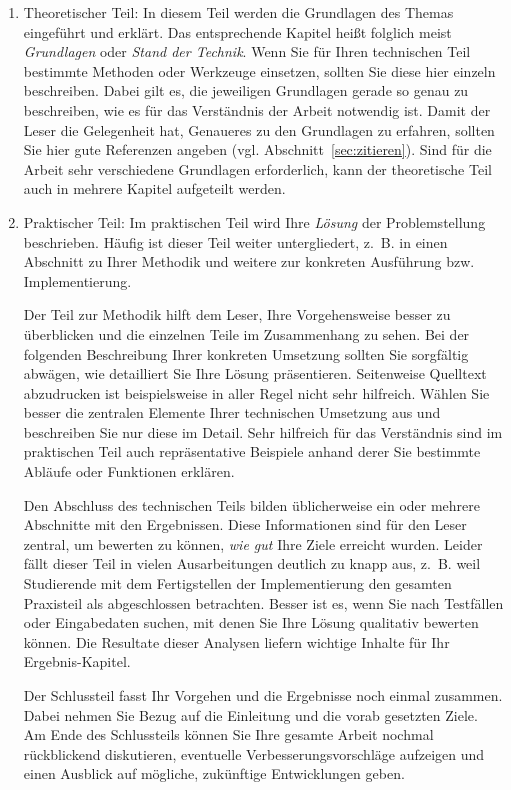 \begin{enumerate}
\item Theoretischer Teil: In diesem Teil werden die Grundlagen des Themas eingeführt und erklärt. Das entsprechende Kapitel heißt folglich meist \textit{Grundlagen} oder \textit{Stand der Technik}. 
Wenn Sie für Ihren technischen Teil bestimmte Methoden oder Werkzeuge einsetzen, sollten Sie diese hier einzeln beschreiben.
Dabei gilt es, die jeweiligen Grundlagen gerade so genau zu beschreiben, wie es für das Verständnis der Arbeit notwendig ist.
Damit der Leser die Gelegenheit hat, Genaueres zu den Grundlagen zu erfahren, sollten Sie hier gute Referenzen angeben (vgl. Abschnitt~\ref{sec:zitieren}).
Sind für die Arbeit sehr verschiedene Grundlagen erforderlich, kann der theoretische Teil auch in mehrere Kapitel aufgeteilt werden. 
\item Praktischer Teil: Im praktischen Teil wird Ihre \textit{Lösung} der Problemstellung beschrieben. Häufig ist dieser Teil weiter untergliedert, z.~B. in einen Abschnitt zu Ihrer Methodik und weitere zur konkreten Ausführung bzw. Implementierung.

Der Teil zur Methodik hilft dem Leser, Ihre Vorgehensweise besser zu überblicken und die einzelnen Teile im Zusammenhang zu sehen.
Bei der folgenden Beschreibung Ihrer konkreten Umsetzung sollten Sie sorgfältig abwägen, wie detailliert Sie Ihre Lösung präsentieren.
Seitenweise Quelltext abzudrucken ist beispielsweise in aller Regel nicht sehr hilfreich.
Wählen Sie besser die zentralen Elemente Ihrer technischen Umsetzung aus und beschreiben Sie nur diese im Detail.
Sehr hilfreich für das Verständnis sind im praktischen Teil auch repräsentative Beispiele anhand derer Sie bestimmte Abläufe oder Funktionen erklären.

Den Abschluss des technischen Teils bilden üblicherweise ein oder mehrere Abschnitte mit den Ergebnissen.
Diese Informationen sind für den Leser zentral, um bewerten zu können, \textit{wie gut} Ihre Ziele erreicht wurden.
Leider fällt dieser Teil in vielen Ausarbeitungen deutlich zu knapp aus, z.~B. weil Studierende mit dem Fertigstellen der Implementierung den gesamten Praxisteil als abgeschlossen betrachten.
Besser ist es, wenn Sie nach Testfällen oder Eingabedaten suchen, mit denen Sie Ihre Lösung qualitativ bewerten können.
Die Resultate dieser Analysen liefern wichtige Inhalte für Ihr Ergebnis-Kapitel.

Der Schlussteil fasst Ihr Vorgehen und die Ergebnisse noch einmal zusammen.
Dabei nehmen Sie Bezug auf die Einleitung und die vorab gesetzten Ziele.
Am Ende des Schlussteils können Sie Ihre gesamte Arbeit nochmal rückblickend diskutieren, eventuelle Verbesserungsvorschläge aufzeigen und einen Ausblick auf mögliche, zukünftige Entwicklungen geben.
\end{enumerate}

